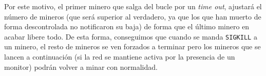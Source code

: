 \documentclass{article}
\begin{document}
Por este motivo, el primer minero que salga del bucle por un \textit{time out}, ajustará el número de mineros (que será superior al verdadero, ya que los que han muerto de forma descontrolada no notificaron su baja) de forma que el último minero en acabar libere todo. De esta forma, conseguimos que cuando se manda \texttt{SIGKILL} a un minero, el resto de mineros se ven forzados a terminar pero los mineros que se lancen a continuación (si la red se mantiene activa por la presencia de un monitor) podrán volver a minar con normalidad.
\end{document}
